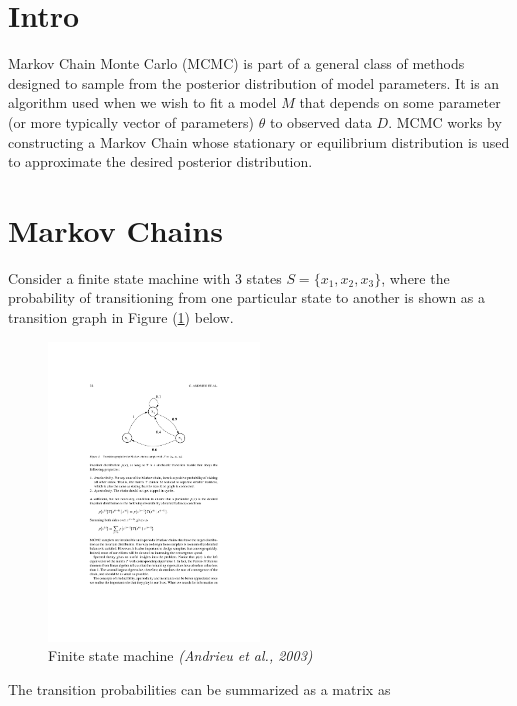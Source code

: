 
\section{Intro}

    Markov Chain Monte Carlo (MCMC) is part of a general class of methods designed to sample from the posterior distribution of model parameters. It is an algorithm used when we wish to fit a model $M$ that depends on some parameter (or more typically vector of parameters) $\theta$ to observed data $D$. MCMC works by constructing a Markov Chain whose stationary or equilibrium distribution is used to approximate the desired posterior distribution.


\section{Markov Chains}

    Consider a finite state machine with 3 states $S = \{x_1, x_2, x_3\}$, where the probability of transitioning from one particular state to another is shown as a transition graph in Figure (\ref{fsm}) below. 

    \begin{figure}[H]
        \centering
        \includegraphics[width=0.5\textwidth]{./images/finitemachine.pdf}
        \caption{Finite state machine \textit{(Andrieu et al., 2003)}}
        \label{fsm}
    \end{figure}

    The transition probabilities can be summarized as a matrix as

